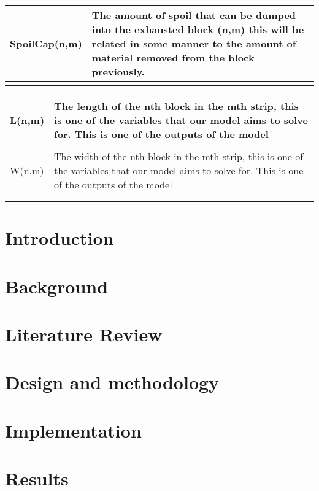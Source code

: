 \documentclass[12pt, openany, a4paper]{book}
\begin{document}
\begin{table}[h!]
\begin{tabular}{p{5cm} p{11cm}}
		SpoilCap(n,m) & The amount of spoil that can be dumped into the exhausted block (n,m) this will be related in some manner to the amount of material removed from the block previously.
		\\
		\hline \\
		\end{tabular}
			\begin{tabular}{p{5cm} p{11cm}} \hline
		L(n,m) & The length of the nth block in the mth strip, this is one of the variables that our model aims to solve for. This is one of the outputs of the model \\ \hline \\ 
		W(n,m) & The width of the nth block in the mth strip, this is one of the variables that our model aims to solve for. This is one of the outputs of the model \\ \hline \\ 
		\label{tab:var}
	\end{tabular}	
\end{table}
\newpage
\chapter{Introduction}


\chapter{Background}


\chapter{Literature Review}


\chapter{Design and methodology}


\chapter{Implementation}


\chapter{Results}

\end{document}

